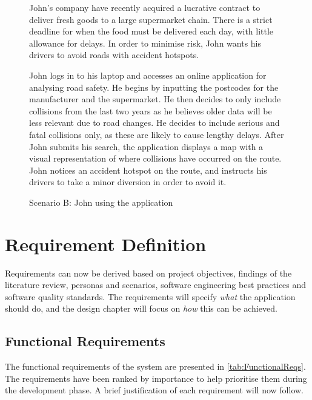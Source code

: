 \documentclass[authoryearcitations]{UoYCSproject}
\begin{document}
\begin{figure}
	\begin{framed}
 		John's company have recently acquired a lucrative contract to deliver fresh goods to a large supermarket chain. There is a strict deadline for when the food must be delivered each day, with little allowance for delays. In order to minimise risk, John wants his drivers to avoid roads with accident hotspots.
 		
 		John logs in to his laptop and accesses an online application for analysing road safety. He begins by inputting the postcodes for the manufacturer and the supermarket. He then decides to only include collisions from the last two years as he believes older data will be less relevant due to road changes. He decides to include serious and fatal collisions only, as these are likely to cause lengthy delays. After John submits his search, the application displays a map with a visual representation of where collisions have occurred on the route. John notices an accident hotspot on the route, and instructs his drivers to take a minor diversion in order to avoid it.
  	\end{framed}
  \caption{Scenario B: John using the application}
  \label{fig:scenarioB}
\end{figure}


\section{Requirement Definition}

Requirements can now be derived based on project objectives, findings of the literature review, personas and scenarios, software engineering best practices and software quality standards. The requirements will specify \textit{what} the application should do, and the design chapter will focus on \textit{how} this can be achieved.

\subsection{Functional Requirements}

The functional requirements of the system are presented in \autoref{tab:FunctionalReqs}. The requirements have been ranked by importance to help prioritise them during the development phase. A brief justification of each requirement will now follow. 
\end{document}
